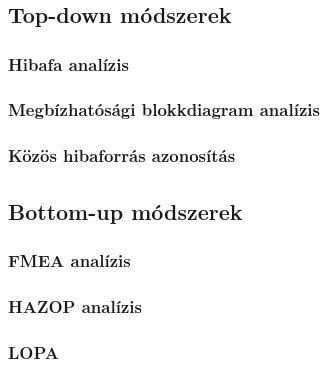 \chapter{\analysis}

\section{Top-down módszerek}
\subsection{Hibafa analízis}

\subsection{Megbízhatósági blokkdiagram analízis}

\subsection{Közös hibaforrás azonosítás}

\section{Bottom-up módszerek}
\subsection{FMEA analízis}

\subsection{HAZOP analízis}

\subsection{LOPA}